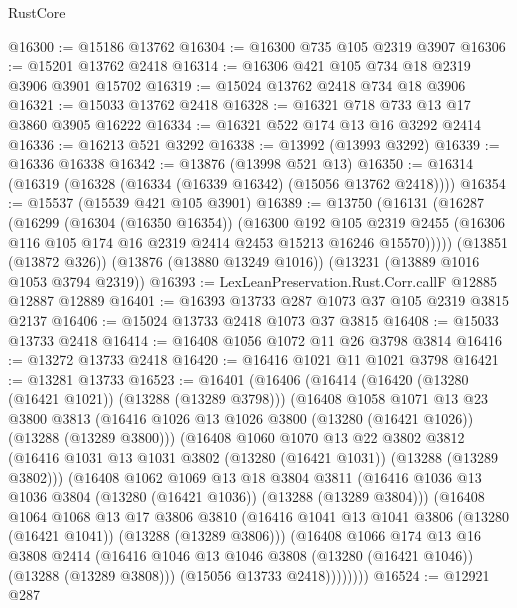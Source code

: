 \begin{lexlean}{RustCore}
\begin{coremodule}
@16300 := @15186 @13762
@16304 := @16300 @735 @105 @2319 @3907
@16306 := @15201 @13762 @2418
@16314 := @16306 @421 @105 @734 @18 @2319 @3906 @3901 @15702
@16319 := @15024 @13762 @2418 @734 @18 @3906
@16321 := @15033 @13762 @2418
@16328 := @16321 @718 @733 @13 @17 @3860 @3905 @16222
@16334 := @16321 @522 @174 @13 @16 @3292 @2414
@16336 := @16213 @521 @3292
@16338 := @13992 (@13993 @3292)
@16339 := @16336 @16338
@16342 := @13876 (@13998 @521 @13)
@16350 := @16314 (@16319 (@16328 (@16334 (@16339 @16342) (@15056 @13762 @2418))))
@16354 := @15537 (@15539 @421 @105 @3901)
@16389 := @13750
    (@16131
      (@16287
        (@16299
          (@16304 (@16350 @16354))
          (@16300
            @192
            @105
            @2319
            @2455
            (@16306 @116 @105 @174 @16 @2319 @2414 @2453 @15213 @16246 @15570)))))
    (@13851 (@13872 @326))
    (@13876 (@13880 @13249 @1016))
    (@13231 (@13889 @1016 @1053 @3794 @2319))
@16393 := LexLeanPreservation.Rust.Corr.callF @12885 @12887 @12889
@16401 := @16393 @13733 @287 @1073 @37 @105 @2319 @3815 @2137
@16406 := @15024 @13733 @2418 @1073 @37 @3815
@16408 := @15033 @13733 @2418
@16414 := @16408 @1056 @1072 @11 @26 @3798 @3814
@16416 := @13272 @13733 @2418
@16420 := @16416 @1021 @11 @1021 @3798
@16421 := @13281 @13733
@16523 := @16401
    (@16406
      (@16414
        (@16420 (@13280 (@16421 @1021)) (@13288 (@13289 @3798)))
        (@16408
          @1058
          @1071
          @13
          @23
          @3800
          @3813
          (@16416 @1026 @13 @1026 @3800 (@13280 (@16421 @1026)) (@13288 (@13289 @3800)))
          (@16408
            @1060
            @1070
            @13
            @22
            @3802
            @3812
            (@16416 @1031 @13 @1031 @3802 (@13280 (@16421 @1031)) (@13288 (@13289 @3802)))
            (@16408
              @1062
              @1069
              @13
              @18
              @3804
              @3811
              (@16416 @1036 @13 @1036 @3804 (@13280 (@16421 @1036)) (@13288 (@13289 @3804)))
              (@16408
                @1064
                @1068
                @13
                @17
                @3806
                @3810
                (@16416 @1041 @13 @1041 @3806 (@13280 (@16421 @1041)) (@13288 (@13289 @3806)))
                (@16408
                  @1066
                  @174
                  @13
                  @16
                  @3808
                  @2414
                  (@16416 @1046 @13 @1046 @3808 (@13280 (@16421 @1046)) (@13288 (@13289 @3808)))
                  (@15056 @13733 @2418))))))))
@16524 := @12921 @287

\end{coremodule}
\end{lexlean}
